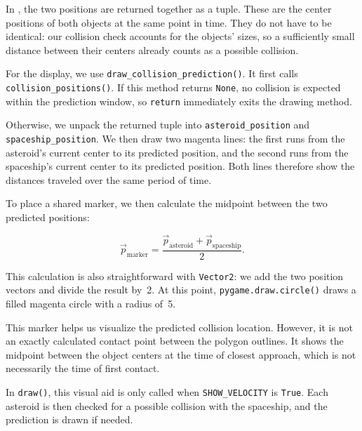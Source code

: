 In , the two positions are returned together as a tuple. These are the center positions of both objects at the same point in time. They do not have to be identical: our collision check accounts for the objects' sizes, so a sufficiently small distance between their centers already counts as a possible collision.


For the display, we use \texttt{draw\_collision\_prediction()}. It first calls \texttt{collision\_pos\-itions()}. If this method returns \texttt{None}, no collision is expected within the prediction window, so \texttt{return} immediately exits the drawing method.

Otherwise, we unpack the returned tuple into \texttt{asteroid\_position} and \texttt{spaceship\_pos\-ition}. We then draw two magenta lines: the first runs from the asteroid's current center to its predicted position, and the second runs from the spaceship's current center to its predicted position. Both lines therefore show the distances traveled over the same period of time.

To place a shared marker, we then calculate the midpoint between the two predicted positions:

\[
\vec p_{\mathrm{marker}}
=
\frac{\vec p_{\mathrm{asteroid}}
	+ \vec p_{\mathrm{spaceship}}}{2}.
\]

This calculation is also straightforward with \texttt{Vector2}: we add the two position vectors and divide the result by~2. At this point, \texttt{pygame.draw.circle()} draws a filled magenta circle with a radius of~\SI{5}{\pixel}.

This marker helps us visualize the predicted collision location. However, it is not an exactly calculated contact point between the polygon outlines. It shows the midpoint between the object centers at the time of closest approach, which is not necessarily the time of first contact.


In \texttt{draw()}, this visual aid is only called when \texttt{SHOW\_VELOCITY} is \texttt{True}. Each asteroid is then checked for a possible collision with the spaceship, and the prediction is drawn if needed.

